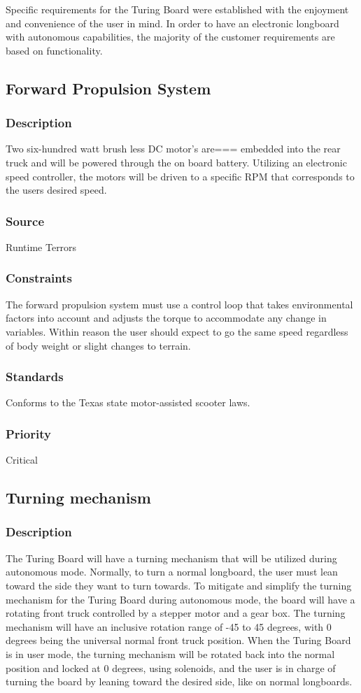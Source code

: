 Specific requirements for the Turing Board were established with the enjoyment and convenience of the user in mind. In order to have an electronic longboard with autonomous capabilities, the majority of the customer requirements are based on functionality.

\subsection{Forward Propulsion System}
\subsubsection{Description}
Two six-hundred watt brush less DC motor's are=== embedded into the rear truck and will be powered through the on board battery. Utilizing an electronic speed controller, the motors will be driven to a specific RPM that corresponds to the users desired speed.
\subsubsection{Source}
Runtime Terrors
\subsubsection{Constraints}
The forward propulsion system must use a control loop that takes environmental factors into account and adjusts the torque to accommodate any change in variables. Within reason the user should expect to go the same speed regardless of body weight or slight changes to terrain.
\subsubsection{Standards}
Conforms to the Texas state motor-assisted scooter laws.
\subsubsection{Priority}
Critical

\subsection{Turning mechanism}
\subsubsection{Description}
The Turing Board will have a turning mechanism that will be utilized during autonomous mode. Normally, to turn a normal longboard, the user must lean toward the side they want to turn towards. To mitigate and simplify the turning mechanism for the Turing Board during autonomous mode, the board will have a rotating front truck controlled by a stepper motor and a gear box. The turning mechanism will have an inclusive rotation range of -45 to 45 degrees, with 0 degrees being the universal normal front truck position. When the Turing Board is in user mode, the turning mechanism will be rotated back into the normal position and locked at 0 degrees, using solenoids, and the user is in charge of turning the board by leaning toward the desired side, like on normal longboards.
